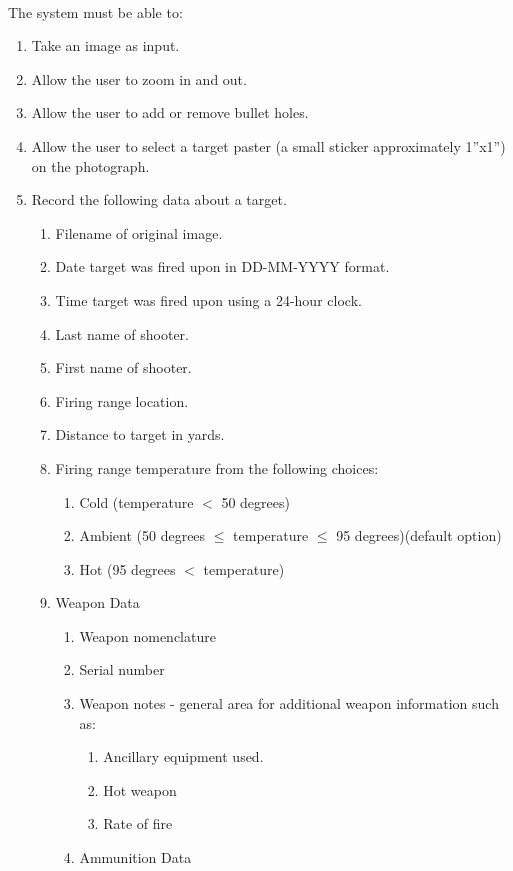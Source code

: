 \paragraph{}The system must be able to:
\begin{enumerate}
	\item Take an image as input.
	\item Allow the user to zoom in and out.
	\item Allow the user to add or remove bullet holes.
	\item Allow the user to select a target paster (a small sticker approximately 1''x1'') on the photograph.
	\item Record the following data about a target.
	\begin{enumerate}
		\item Filename of original image.
		\item Date target was fired upon in DD-MM-YYYY format.
		\item Time target was fired upon using a 24-hour clock.
		\item Last name of shooter.
		\item First name of shooter.
		\item Firing range location.
		\item Distance to target in yards.
		\item Firing range temperature from the following choices:
		\begin{enumerate}
			\item Cold (temperature $<$ 50 degrees)
			\item Ambient (50 degrees $\le$ temperature $\le$ 95 degrees)(default option)
			\item Hot (95 degrees $<$ temperature)
		\end{enumerate}
		\item Weapon Data
		\begin{enumerate}
			\item Weapon nomenclature
			\item Serial number
			\item Weapon notes - general area for additional weapon information such as:
			\begin{enumerate}
				\item Ancillary equipment used.
				\item Hot weapon
				\item Rate of fire
			\end{enumerate}
			\item Ammunition Data

\end{enumerate}
\end{enumerate}
\end{enumerate}
